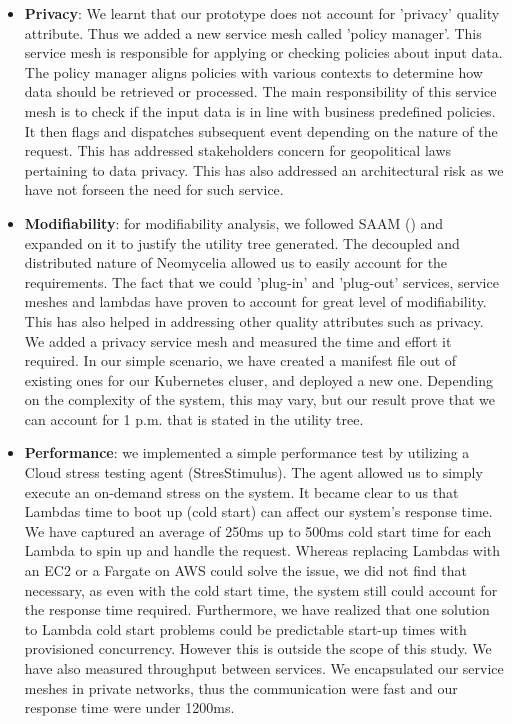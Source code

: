 \documentclass[conference]{IEEEtran}
\begin{document}
\begin{itemize}
    \item \textbf{Privacy}: We learnt that our prototype does not account for 'privacy' quality attribute. Thus we added a new service mesh called 'policy manager'. This service mesh is responsible for applying or checking policies about input data. The policy manager aligns policies with various contexts to determine how data should be retrieved or processed. The main responsibility of this service mesh is to check if the input data is in line with business predefined policies. It then flags and dispatches subsequent event depending on the nature of the request. This has addressed stakeholders concern for geopolitical laws pertaining to data privacy. This has also addressed an architectural risk as we have not forseen the need for such service.
    \item \textbf{Modifiability}: for modifiability analysis, we followed SAAM (\cite{kazman1994saam}) and expanded on it to justify the utility tree generated. The decoupled and distributed nature of Neomycelia allowed us to easily account for the requirements. The fact that we could 'plug-in' and 'plug-out' services, service meshes and lambdas have proven to account for great level of modifiability. This has also helped in addressing other quality attributes such as privacy. We added a privacy service mesh and measured the time and effort it required. In our simple scenario, we have created a manifest file out of existing ones for our Kubernetes cluser, and deployed a new one. Depending on the complexity of the system, this may vary, but our result prove that we can account for 1 p.m. that is stated in the utility tree.
    \item \textbf{Performance}: we implemented a simple performance test by utilizing a Cloud stress testing agent (StresStimulus). The agent allowed us to simply execute an on-demand stress on the system. It became clear to us that Lambdas time to boot up (cold start) can affect our system's response time. We have captured an average of 250ms up to 500ms cold start time for each Lambda to spin up and handle the request. Whereas replacing Lambdas with an EC2 or a Fargate on AWS could solve the issue, we did not find that necessary, as even with the cold start time, the system still could account for the response time required. Furthermore, we have realized that one solution to Lambda cold start problems could be predictable start-up times with provisioned concurrency. However this is outside the scope of this study. We have also measured throughput between services. We encapsulated our service meshes in private networks, thus the communication were fast and our response time were under 1200ms.
\end{itemize}
\end{document}
